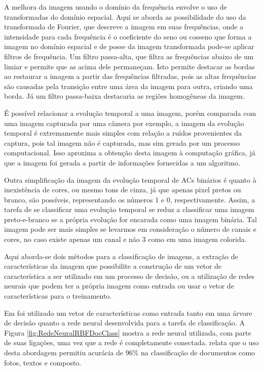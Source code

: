 \documentclass[12pt,a4paper]{report}
\begin{document}
	A melhora da imagem usando o domínio da frequência envolve o uso de transformadas do domínio espacial. Aqui se aborda as possibilidade do uso da transformada de Fourier, que descreve a imagem em suas frequências, onde a intensidade para cada frequência é o coeficiente do seno ou cosseno que forma a imagem no domínio espacial e de posse da imagem transformada pode-se aplicar filtros de frequência. Um filtro passa-alta, que filtra as frequências abaixo de um limiar e permite que as acima dele permaneçam. Isto permite destacar as bordas ao restaurar a imagem a partir das frequências filtradas, pois as altas frequências são causadas pela transição entre uma área da imagem para outra, criando uma borda. Já um filtro passa-baixa destacaria as regiões homogêneas da imagem.  
	
	É possível relacionar a evolução temporal a uma imagem, porém comparada com uma imagem capturada por uma câmera por exemplo, a imagem da evolução temporal é extremamente mais simples com relação a ruídos provenientes da captura, pois tal imagem não é capturada, mas sim gerada por um processo computacional. Isso aproxima a obtenção desta imagem à computação gráfica, já que a imagem foi gerada a partir de informações fornecidas a um algoritmo.
	
	Outra simplificação da imagem da evolução temporal de ACs binários é quanto à inexistência de cores, ou mesmo tons de cinza, já que apenas pixel pretos ou branco, são possíveis, representando os números 1 e 0, respectivamente. Assim, a tarefa de se classificar uma evolução temporal se reduz a classificar uma imagem preto-e-branco se a própria evolução for encarada como uma imagem binária. Tal imagem pode ser mais simples se levarmos em consideração o número de canais e cores, no caso existe apenas um canal e não 3 como em uma imagem colorida.
	
	Aqui aborda-se dois métodos para a classificação de imagens, a extração de características da imagem que possibilite a construção de um vetor de característica a ser utilizado em um processo de decisão, ou a utilização de redes neurais que podem ter a própria imagem como entrada ou usar o vetor de características para o treinamento.
	
	Em  foi utilizado um vetor de características como entrada tanto em uma árvore de decisão quanto a rede neural desenvolvida para a tarefa de classificação. A Figura \ref{fig:RedeNeuralRBFDocClass} mostra a rede neural utilizada, com parte de suas ligações, uma vez que a rede é completamente conectada.  relata que o uso desta abordagem permitiu acurácia de 96\% na classificação de documentos como fotos, textos e composto.
	
\end{document}

